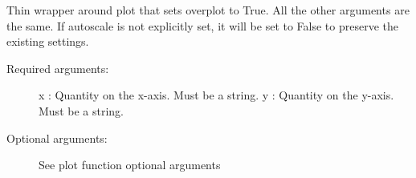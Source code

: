 \documentclass[letterpaper,10pt,english]{sphinxmanual}
\begin{document}

\begin{fulllineitems}
\label{index:facade.addplot}
Thin wrapper around plot that sets overplot to True.  All the other
arguments are the same. If autoscale is not explicitly set, it will be set
to False to preserve the existing settings.
\begin{description}
\item[{Required arguments:}] \leavevmode
x          : Quantity on the x-axis. Must be a string.
y          : Quantity on the y-axis. Must be a string.

\item[{Optional arguments:}] \leavevmode
See plot function optional arguments

\end{description}

\end{fulllineitems}

\end{document}
